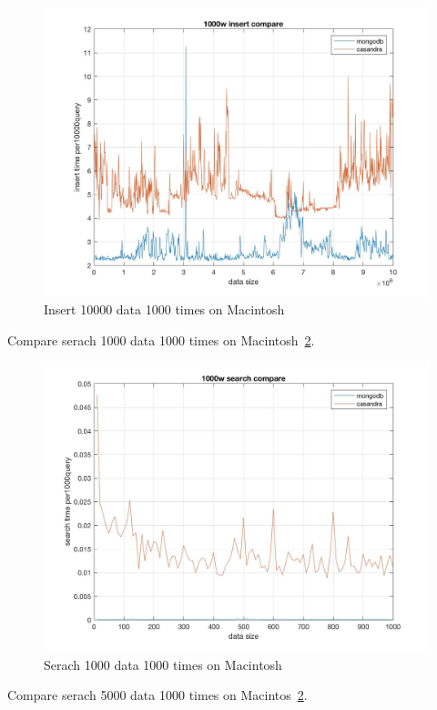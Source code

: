 \begin{figure}[!ht]
  \centering\includegraphics[width=\columnwidth]
  {images/insert_comp_10000.jpg}
  \caption{Insert 10000 data 1000 times on Macintosh}\label{f:fly}
\end{figure}

Compare serach 1000 data 1000 times on Macintosh~\ref{f:fly}.

\begin{figure}[!ht]
  \centering\includegraphics[width=\columnwidth]
  {images/search_comp_1000.jpg}
  \caption{Serach 1000 data 1000 times on Macintosh }\label{f:fly}
\end{figure}

Compare serach 5000 data 1000 times on Macintos~\ref{f:fly}.

